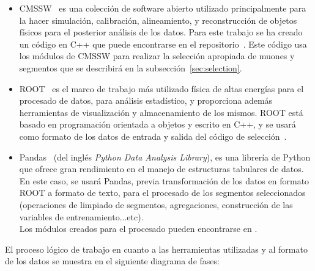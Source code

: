 \begin{itemize}

\item CMSSW~\cite{cmssw} es una colecci\'on de software abierto utilizado principalmente para la hacer simulaci\'on, calibraci\'on, alineamiento, y reconstrucci\'on de objetos f\'isicos para el posterior an\'alisis de los datos. Para este trabajo se ha creado un c\'odigo en C++ que puede encontrarse en el repositorio~\cite{analyzer}. Este c\'odigo usa los m\'odulos de CMSSW para realizar la selecci\'on apropiada de muones y segmentos que se describir\'a en la subsecci\'on~\ref{sec:selection}. 

\item ROOT~\cite{root} es el marco de trabajo m\'as utilizado f\'isica de altas energ\'ias para el procesado de datos, para an\'alisis estad\'istico, y proporciona adem\'as herramientas de visualizaci\'on y almacenamiento de los mismos. ROOT est\'a basado en programaci\'on orientada a objetos y escrito en C++, y se usar\'a como formato de los datos de entrada y salida del c\'odigo de selecci\'on~\cite{analyzer}.

\item Pandas~\cite{mckinney-proc-scipy-2010} (del ingl\'es \textit{Python Data Analysis Library}), es una librer\'ia de Python que ofrece gran rendimiento en el manejo de estructuras tabulares de datos. En este caso, se usar\'a Pandas, previa transformaci\'on de los datos en formato ROOT a formato de texto, para el procesado de los segmentos seleccionados (operaciones de limpiado de segmentos, agregaciones, construcci\'on de las variables de entrenamiento...etc). \\
Los m\'odulos creados para el procesado pueden encontrarse en \cite{processor}.

\end{itemize}


El proceso l\'ogico de trabajo en cuanto a las herramientas utilizadas y al formato de los datos se muestra en el siguiente diagrama de fases: 

\begin{center}
\end{center}


